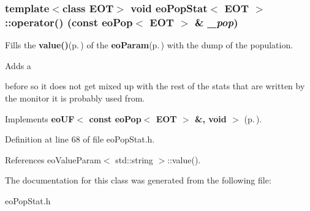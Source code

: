 \subsubsection{\setlength{\rightskip}{0pt plus 5cm}template$<$class EOT$>$ void {\bf eo\-Pop\-Stat}$<$ {\bf EOT} $>$::operator() (const {\bf eo\-Pop}$<$ {\bf EOT} $>$ \& {\em \_\-pop})\hspace{0.3cm}{\tt  [inline, virtual]}}\label{classeo_pop_stat_a1}


Fills the {\bf value()}{\rm (p.\,\pageref{classeo_value_param_a2})} of the {\bf eo\-Param}{\rm (p.\,\pageref{classeo_param})} with the dump of the population. 

Adds a \par
 before so it does not get mixed up with the rest of the stats that are written by the monitor it is probably used from. 

Implements {\bf eo\-UF$<$ const eo\-Pop$<$ EOT $>$ \&, void $>$} {\rm (p.\,\pageref{classeo_u_f_a1})}.

Definition at line 68 of file eo\-Pop\-Stat.h.

References eo\-Value\-Param$<$ std::string $>$::value().

The documentation for this class was generated from the following file:\begin{CompactItemize}
\item 
eo\-Pop\-Stat.h\end{CompactItemize}
